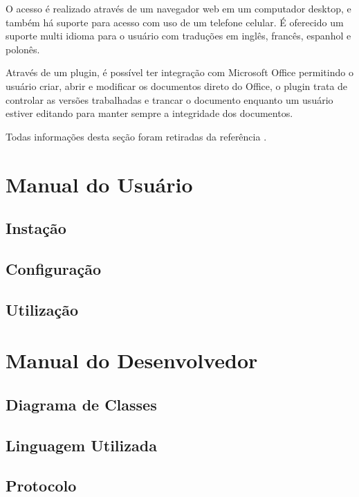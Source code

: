 \documentclass{abnt}
\begin{document}
	O acesso é realizado através de um navegador web em um computador desktop, e também há suporte para acesso com uso de
	um telefone celular. É oferecido um suporte multi idioma para o usuário com traduções em inglês, francês, espanhol e
	polonês.
	
	Através de um plugin, é possível ter integração com Microsoft Office permitindo o usuário criar, abrir e modificar os
	documentos direto do Office, o plugin trata de controlar as versões trabalhadas e trancar o documento enquanto um
	usuário estiver editando para manter sempre a integridade dos documentos.
	
	Todas informações desta seção foram retiradas da referência \cite{QUOTERO}.
	
	

\clearpage
\chapter{Manual do Usuário}

\section{Instação}		
\section{Configuração}		
\section{Utilização}		
		


\clearpage
\chapter{Manual do Desenvolvedor}
\section{Diagrama de Classes}		
\section{Linguagem Utilizada}		
\section{Protocolo}		





\clearpage
\nocite{*}
		
		
\end{document}

